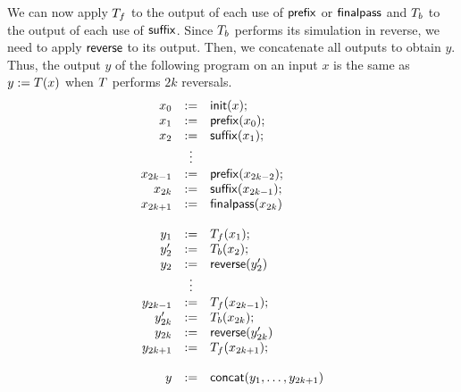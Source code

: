 We can now apply $T_f$ to the output of each use of $\mathsf{prefix}$ or
$\mathsf{finalpass}$ and $T_b$ to the output of each use of $\mathsf{suffix}$.
%
Since $T_b$ performs its simulation in reverse, we need to apply
$\mathsf{reverse}$ to its output.
%
Then, we concatenate all outputs to obtain $y$.
%
Thus, the output $y$ of the following program on an input $x$ is the same as
$y := T(x)$
when $T$ performs $2k$ reversals.
\[
    \begin{array}{rcl}
        x_0 &:=& \mathsf{init}(x); \\
        x_1 &:=& \mathsf{prefix}(x_0); \\
        x_2 &:=& \mathsf{suffix}(x_1); \\
        &\vdots& \\
        x_{2k-1} &:=& \mathsf{prefix}(x_{2k-2}); \\
        x_{2k} &:=& \mathsf{suffix}(x_{2k-1}); \\
        x_{2k+1} &:=& \mathsf{finalpass}(x_{2k}) \\
        \\
        y_1 &:=& T_f(x_1); \\
        y'_2 &:=& T_b(x_2); \\
        y_2 &:=& \mathsf{reverse}(y'_2) \\
        &\vdots& \\
        y_{2k-1} &:=& T_f(x_{2k-1}); \\
        y'_{2k} &:=& T_b(x_{2k}); \\
        y_{2k} &:=& \mathsf{reverse}(y'_{2k}) \\
        y_{2k+1} &:=& T_f(x_{2k+1}); \\
        \\
        y &:=& \mathsf{concat}(y_1, \ldots, y_{2k+1})
    \end{array}
\]

